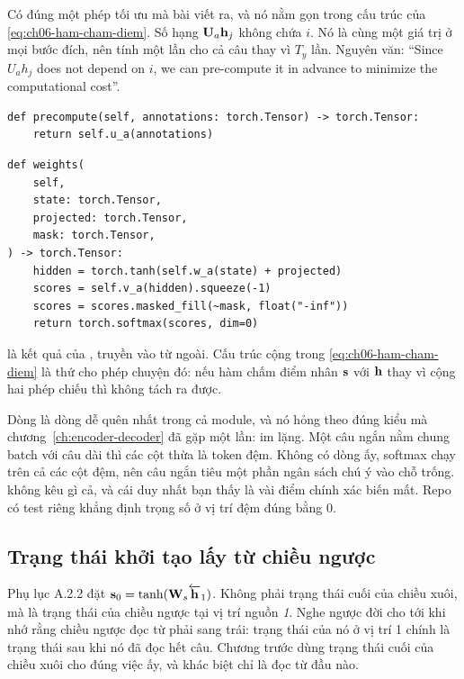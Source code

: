 %
Có đúng một phép tối ưu mà bài viết ra, và nó nằm gọn trong cấu trúc của
\eqref{eq:ch06-ham-cham-diem}. Số hạng \(\mathbf{U}_a \mathbf{h}_j\) không chứa
\(i\). Nó là cùng một giá trị ở mọi bước đích, nên tính một lần cho cả câu
thay vì \(T_y\) lần. Nguyên văn: \enquote{Since \(U_a h_j\) does not depend on
\(i\), we can pre-compute it in advance to minimize the computational cost}.

\begin{verbatim}
def precompute(self, annotations: torch.Tensor) -> torch.Tensor:
    return self.u_a(annotations)
\end{verbatim}

\begin{verbatim}
def weights(
    self,
    state: torch.Tensor,
    projected: torch.Tensor,
    mask: torch.Tensor,
) -> torch.Tensor:
    hidden = torch.tanh(self.w_a(state) + projected)
    scores = self.v_a(hidden).squeeze(-1)
    scores = scores.masked_fill(~mask, float("-inf"))
    return torch.softmax(scores, dim=0)
\end{verbatim}

 là kết quả của , truyền vào từ ngoài. Cấu
trúc cộng trong \eqref{eq:ch06-ham-cham-diem} là thứ cho phép chuyện đó: nếu
hàm chấm điểm nhân \(\mathbf{s}\) với \(\mathbf{h}\) thay vì cộng hai phép chiếu
thì không tách ra được.

%
Dòng  là dòng dễ quên nhất trong cả module, và nó hỏng theo
đúng kiểu mà chương~\ref{ch:encoder-decoder} đã gặp một lần: im lặng. Một câu
ngắn nằm chung batch với câu dài thì các cột thừa là token đệm. Không có dòng
ấy, softmax chạy trên cả các cột đệm, nên câu ngắn tiêu một phần ngân sách chú
ý vào chỗ trống.  không kêu gì cả, và cái duy
nhất bạn thấy là vài
điểm chính xác biến mất. Repo có test riêng khẳng định trọng số ở vị trí đệm
đúng bằng 0.

\subsection*{Trạng thái khởi tạo lấy từ chiều ngược}

%
Phụ lục A.2.2 đặt \(\mathbf{s}_0 = \tanh(\mathbf{W}_s \overleftarrow{\mathbf{h}}_1)\).
Không phải trạng thái cuối của chiều xuôi, mà là trạng thái của chiều ngược tại
vị trí nguồn \emph{1}. Nghe ngược đời cho tới khi nhớ rằng chiều ngược đọc từ
phải sang trái: trạng thái của nó ở vị trí 1 chính là trạng thái sau khi nó đã
đọc hết câu. Chương trước dùng trạng thái cuối của chiều xuôi cho đúng việc ấy,
và khác biệt chỉ là đọc từ đầu nào.


